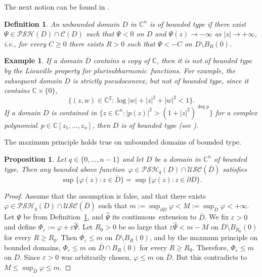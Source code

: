 \documentclass[10pt,a4paper]{amsart}
\newtheorem{prop}[thm]{Proposition}
\newtheorem{defn}[thm]{Definition}
\newtheorem{ex}[thm]{Example}
\newtheorem{rem}[thm]{Remark}
\numberwithin{equation}{section}
\newcommand{\TP}[1]{\textcolor{red}{[#1]}}
\newcommand{\cbb}{\mathbb{C}}
\newcommand{\ccal}{\mathcal{C}}
\newcommand{\pcal}{\mathcal{P}}
\newcommand{\USC}{\mathcal{USC}}
\newcommand{\psh}{pluri\-sub\-harmonic}
\newcommand{\qpsh}{$q$-pluri\-sub\-harmonic}
\newcommand{\PSH}{\mathcal{PSH}}
\newcommand{\spsc}{strictly pseudo\-convex}
\newcommand{\cl}[1]{\overline{#1}}
\newcommand{\cont}{continuous}
\newcommand{\fct}{function}
\newcommand{\fcts}{functions}
\newcommand{\cld}{\overline{D}}
\newcommand{\eps}{\varepsilon}
\newcommand{\vphi}{\varphi}
\begin{document}

The next notion can be found in \cite{NH}.

\begin{defn}\label{defn-bounded-type} An unbounded domain $D$ in $\cbb^n$ is of \textit{bounded type} if there exist $\Psi \in \PSH(D)\cap \ccal(D)$ such that $\Psi <0$ on $D$ and $\Psi(z)\to-\infty$ as $|z|\to+\infty$, i.e., for every $C\geq0$ there exists $R>0$ such that $\Psi < -C$ on $D\setminus B_R(0)$.
\end{defn}

\begin{ex} If a domain $D$ contains a copy of $\cbb$, then it is not of bounded type by the Liouville property for \psh\ \fcts. For example, the subsequent domain $D$ is \spsc, but not of bounded type, since it contains  $\cbb\times\{0\}$,
\[
\{(z,w) \in \cbb^2 : \log|w| + |z|^2+|w|^2<1\}.
\]
If a domain $D$ is contained in $\{z \in \cbb^n : |p(z)|^2>(1+|z|^2)^{\deg p}\}$ for a complex polynomial~$p \in \cbb[z_1,\ldots,z_n]$, then $D$ is of bounded type (see \cite{NH}). 
\end{ex}

The maximum principle holds true on unbounded domains of bounded type.

\begin{prop} \label{prop-qpsh-max-princ-2} Let $q\in\{ 0,\ldots,n-1\}$ and let $D$ be a domain in $\cbb^n$ of bounded type. Then any bounded above \fct\ $\vphi \in \PSH_q(D) \cap \USC(\cl{D})$ satisfies
\[
\sup\{ \vphi(z) : z \in \cl{D}\} = \sup\{\vphi(z) : z \in \partial D\}.
\]
\end{prop}

\begin{proof} Assume that the assumption is false, and that there exists $\vphi \in \PSH_q(D) \cap \USC(\cl{D})$ such that $
m:=\sup_{\partial D}\vphi < M:=\sup_{\cld} \vphi < +\infty$. Let $\Psi$ be from Definition~\ref{defn-bounded-type}, and $\widehat{\Psi}$ its \cont\ extension to $\cld$. We fix $\eps>0$ and define $\Phi_{\eps}:=\varphi+\eps\widehat{\Psi}$. Let $R_0>0$ be so large that $\eps\widehat{\Psi}< m-M$ on $\cld\setminus B_{R_0}(0)$ for every $R\geq R_0$. Then $\Phi_{\eps} \leq m$ on $\cld\setminus B_{R}(0)$, and by the maxmum principle on bounded domains, $\Phi_{\eps} \leq m$ on $\cld \cap \cl{B_{R}(0)}$ for every $R \geq R_0$. Therefore, $\Phi_{\eps} \leq m$ on $\cld$. Since $\eps>0$ was arbitrarily chosen, $\varphi \leq m$ on $\cld$. But this contradicts to $M\leq\sup_{\cld} \vphi \leq m$.
\end{proof}
\end{document}
